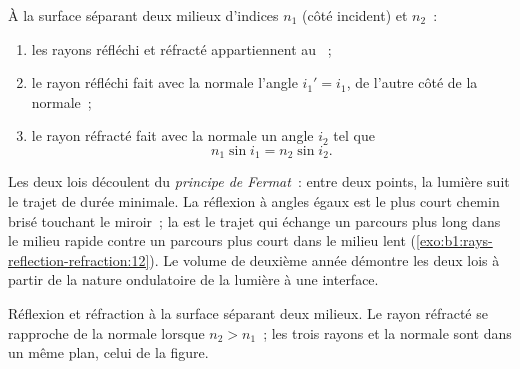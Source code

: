 \begin{theorem}\label{thm:b1:rays-reflection-refraction:snell}
À la surface séparant deux milieux d'indices $n_1$ (côté incident) et
$n_2$~:
\begin{enumerate}
  \item les rayons réfléchi et réfracté appartiennent au ~;
  \item le rayon réfléchi fait avec la normale l'angle $i_1' = i_1$, de
        l'autre côté de la normale~;
  \item le rayon réfracté fait avec la normale un angle $i_2$ tel que
        \[
        n_1 \sin i_1 = n_2 \sin i_2 .
        \]
\end{enumerate}
\end{theorem}
\admitted

\begin{remark}\label{rem:b1:rays-reflection-refraction:fermat}
Les deux lois découlent du \emph{principe de Fermat}~: entre deux
points, la lumière suit le trajet de durée minimale. La réflexion à
angles égaux est le plus court chemin brisé touchant le miroir~; la  est le trajet qui échange un parcours plus long dans
le milieu rapide contre un parcours plus court dans le milieu lent
(\cref{exo:b1:rays-reflection-refraction:12}). Le volume de deuxième
année démontre les deux lois à partir de la nature ondulatoire de la
lumière à une interface.
\end{remark}

\begin{omfigure}

{\small Réflexion et réfraction à la surface séparant deux milieux. Le
rayon réfracté se rapproche de la normale lorsque $n_2 > n_1$~; les
trois rayons et la normale sont dans un même plan, celui de la figure.}
\end{omfigure}

